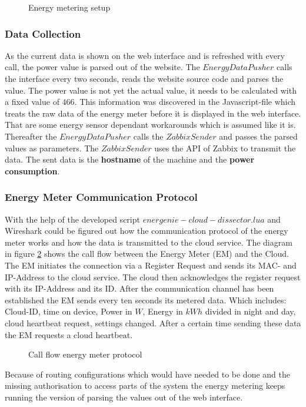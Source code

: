 \begin{figure}
	\centering
	\def\svgwidth{\columnwidth}
	
	\caption{Energy metering setup}
	\label{fig:energyMeteringSetup}
\end{figure}

\subsubsection{Data Collection}
As the current data is shown on the web interface and is refreshed with every call, the power value is parsed out of the website. The $ EnergyDataPusher $ calls the interface every two seconds, reads the website source code and parses the value. The power value is not yet the actual value, it needs to be calculated with a fixed value of $ 466 $. This information was discovered in the Javascript-file which treats the raw data of the energy meter before it is displayed in the web interface. That are some energy sensor dependant workarounds which is assumed like it is. Thereafter the $ EnergyDataPusher $ calls the $ ZabbixSender $ and passes the parsed values as parameters. The $ ZabbixSender $ uses the API of Zabbix to transmit the data. The sent data is the \textbf{hostname} of the machine and the \textbf{power consumption}.

\subsubsection{Energy Meter Communication Protocol}
With the help of the developed script $ energenie-cloud-dissector.lua $ and Wireshark could be figured out how the communication protocol of the energy meter works and how the data is transmitted to the cloud service. The diagram in figure \ref{fig:energyCommunicationProtocol} shows the call flow between the Energy Meter (EM) and the Cloud. The EM initiates the connection via a Register Request and sends its MAC- and IP-Address to the cloud service. The cloud then acknowledges the register request with its IP-Address and its ID. After the communication channel has been established the EM sends every ten seconds its metered data. Which includes: Cloud-ID, time on device, Power in $ W $, Energy in $ kWh $ divided in night and day, cloud heartbeat request, settings changed. After a certain time sending these data the EM requests a cloud heartbeat.

\begin{figure}
	\centering
	\def\svgwidth{0.75\columnwidth}
	
	\caption{Call flow energy meter protocol}
	\label{fig:energyCommunicationProtocol}
\end{figure}

Because of routing configurations which would have needed to be done and the missing authorisation to access parts of the system the energy metering keeps running the version of parsing the values out of the web interface.








